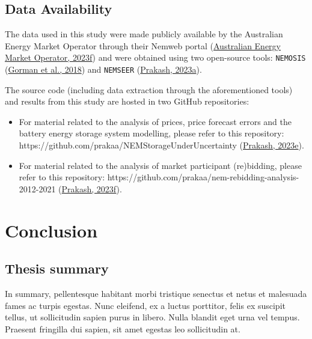 \documentclass[12pt,a4paper,]{report}
\providecommand{\tightlist}{%
  \setlength{\itemsep}{0pt}\setlength{\parskip}{0pt}}
\begin{document}
\hypertarget{data-availability}{%
\section*{Data Availability}\label{data-availability}}

The data used in this study were made publicly available by the
Australian Energy Market Operator through their Nemweb portal
(\protect\hyperlink{ref-australianenergymarketoperatorNemwebMarketData2023}{Australian
Energy Market Operator, 2023f}) and were obtained using two open-source
tools: \texttt{NEMOSIS}
(\protect\hyperlink{ref-gormanNEMOSISNEMOpen2018}{Gorman et al., 2018})
and \texttt{NEMSEER}
(\protect\hyperlink{ref-prakashNEMSEER2023}{Prakash, 2023a}).

The source code (including data extraction through the aforementioned
tools) and results from this study are hosted in two GitHub
repositories:

\begin{itemize}
\tightlist
\item
  For material related to the analysis of prices, price forecast errors
  and the battery energy storage system modelling, please refer to this
  repository: https://github.com/prakaa/NEMStorageUnderUncertainty
  (\protect\hyperlink{ref-prakashNEMStorageUnderUncertainty2023}{Prakash,
  2023e}).
\item
  For material related to the analysis of market participant
  (re)bidding, please refer to this repository:
  https://github.com/prakaa/nem-rebidding-analysis-2012-2021
  (\protect\hyperlink{ref-prakashNEMReBidding2023}{Prakash, 2023f}).
\end{itemize}

\hypertarget{sec:conclusion}{%
\chapter{Conclusion}\label{sec:conclusion}}

\hypertarget{thesis-summary}{%
\section{Thesis summary}\label{thesis-summary}}

In summary, pellentesque habitant morbi tristique senectus et netus et
malesuada fames ac turpis egestas. Nunc eleifend, ex a luctus porttitor,
felis ex suscipit tellus, ut sollicitudin sapien purus in libero. Nulla
blandit eget urna vel tempus. Praesent fringilla dui sapien, sit amet
egestas leo sollicitudin at.
\end{document}

